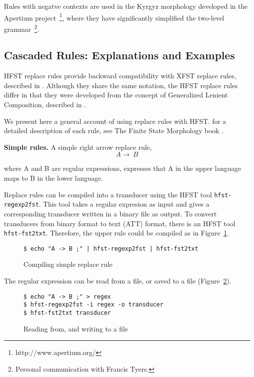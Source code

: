 \documentclass{llncs}
\begin{document}
Rules with negatve contexts are used in the Kyrgyz morphology
developed in the Apertium project~\footnote{http://www.apertium.org/},
where they have significantly simplified the two-level
grammar~\footnote{Personal communication with Francis Tyers.}.

\subsection{Cascaded Rules: Explanations and Examples}

HFST replace rules provide backward compatibility with XFST replace rules, 
described in \cite{Kempe96parallelreplacement}\cite{beesley/2003}. 
Although they share the same notation, the HFST replace rules differ in that
they were developed from the concept of Generalized Lenient Composition, 
described in \cite{ylijyra/2008b}.

We present here a general account of using replace rules with HFST.
for a detailed description of each rule, see
The Finite State Morphology book \cite{beesley/2003}.


\textbf{Simple rules.} A simple right arrow replace rule,
\begin{equation}
  A \rightarrow\ B
\end{equation}

where A and B are regular expressions, 
expresses that A in the upper language maps to B in the lower language.

Replace rules can be compiled into a transducer using the HFST tool 
\verb!hfst-regexp2fst!. This tool takes a regular expresion as input 
and gives a corresponding transducer written in a binary file as output. 
To convert transducers from binary format to text (ATT) format, 
there is an HFST tool \verb!hfst-fst2txt!. Therefore, the upper rule 
could be compiled as in Figure~\ref{fig:simple_replace}.

\begin{figure} [h!]
\begin{verbatim}
$ echo "A -> B ;" | hfst-regexp2fst | hfst-fst2txt
\end{verbatim}
\caption{Compiling simple replace rule}
\label{fig:simple_replace}
\end{figure}


The regular expression can be read from a file, or saved to a file (Figure~\ref{fig:read_from_file}). 

\begin{figure} [h!]
\begin{verbatim}
$ echo "A -> B ;" > regex
$ hfst-regexp2fst -i regex -o transducer
$ hfst-fst2txt transducer
\end{verbatim}
\caption{Reading from, and writing to a file}
\label{fig:read_from_file}
\end{figure}
\end{document}
